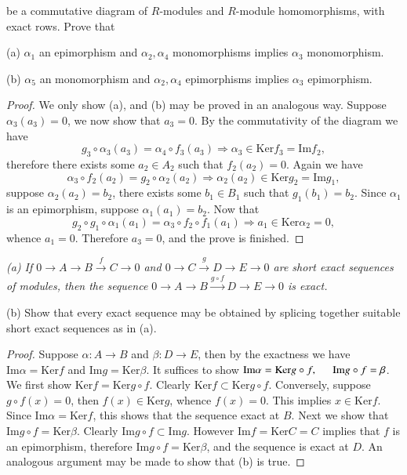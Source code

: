 \begin{problem}
\begin{center}
\begin{tikzpicture}[x=0.75pt,y=0.75pt,yscale=-1,xscale=1]
\end{tikzpicture}
\end{center}
be a commutative diagram of $R$-modules and $R$-module homomorphisms, with exact rows. Prove that \par
(a) $\alpha_1$ an epimorphism and $\alpha_2,\alpha_4$ monomorphisms implies $\alpha_3$ monomorphism.\par
(b) $\alpha_5$ an monomorphism and $\alpha_2,\alpha_4$ epimorphisms implies $\alpha_3$ epimorphism.
\end{problem}
\begin{proof}
We only show (a), and (b) may be proved in an analogous way. Suppose $\alpha_3(a_3)=0$, we now show that $a_3=0$. By the commutativity of the diagram we have 
$$
g_3\circ \alpha _3\left( a_3 \right) =\alpha _4\circ f_3\left( a_3 \right) \Rightarrow \alpha _3\in \mathrm{Ker}f_3=\mathrm{Im}f_2,
$$
therefore there exists some $a_2\in A_2$ such that $f_2(a_2)=0$. Again we have 
$$
\alpha _3\circ f_2\left( a_2 \right) =g_2\circ \alpha _2\left( a_2 \right) \Rightarrow \alpha _2\left( a_2 \right) \in \mathrm{Ker}g_2=\mathrm{Im}g_1,
$$
suppose $\alpha_2(a_2)=b_2$, there exists some $b_1\in B_1$ such that $g_1(b_1)=b_2$. Since $\alpha_1$ is an epimorphism, suppose $\alpha_1(a_1)=b_2$. Now that 
$$
g_2\circ g_1\circ \alpha _1\left( a_1 \right) =\alpha _3\circ f_2\circ f_1\left( a_1 \right) \Rightarrow a_1\in \mathrm{Ker}\alpha _2=0,
$$
whence $a_1=0$. Therefore $a_3=0$, and the prove is finished.
\end{proof}
\begin{problem}\em
(a) If $0\longrightarrow A\longrightarrow B\overset{f}{\longrightarrow}C\longrightarrow 0$ and $0\longrightarrow C\overset{g}{\longrightarrow}D\longrightarrow E\longrightarrow 0$ are short exact sequences of modules, then the sequence $0\longrightarrow A\longrightarrow B\overset{g\circ f}{\longrightarrow}D\longrightarrow E\longrightarrow 0$ is exact.\par
(b) Show that every exact sequence may be obtained by splicing together suitable short exact sequences as in (a).
\end{problem}
\begin{proof}
Suppose $\alpha:A\to B$ and $\beta:D\to E$, then by the exactness we have $\mathrm{Im}\alpha=\mathrm{Ker}f$ and $\mathrm{Im}g=\mathrm{Ker}\beta$. It suffices to show $\mathrm{Im}\alpha =\mathrm{Ker}g\circ f,\hspace{0.5cm}\mathrm{Im}g\circ f=\beta $. We first show $\mathrm{Ker}f=\mathrm{Ker}g\circ f$. Clearly $\mathrm{Ker}f\subset\mathrm{Ker}g\circ f$. Conversely, suppose $g\circ f(x)=0$, then $f(x)\in\mathrm{Ker}g$, whence $f(x)=0$. This implies $x\in\mathrm{Ker}f$. Since $\mathrm{Im}\alpha=\mathrm{Ker}f$, this shows that the sequence exact at $B$. Next we show that $\mathrm{Im}g\circ f=\mathrm{Ker}\beta$. Clearly $\mathrm{Im}g\circ f\subset\mathrm{Im}g$. However $\mathrm{Im}f=\mathrm{Ker}C=C$ implies that $f$ is an epimorphism, therefore $\mathrm{Im}g\circ f=\mathrm{Ker}\beta$, and the sequence is exact at $D$. An analogous argument may be made to show that (b) is true.
\end{proof}
